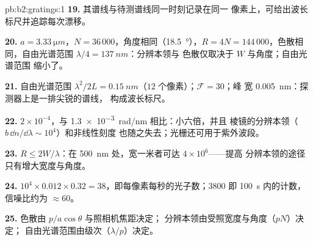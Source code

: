 \begin{solution}{pb:b2:gratings:1}
\textbf{19.} 其谱线与待测谱线同一时刻记录在同一
像素上，可给出波长标尺并追踪每次漂移。

\textbf{20.} $a = \qty{3.33}{\micro m}$，$N = 36\,000$，角度相同（\qty{18.5}{\degree}），$R = 4N
= 144\,000$，色散相同，自由光谱范围 $\lambda/4 = \qty{137}{nm}$：分辨本领与
色散仅取决于 $W$ 与角度；自由光谱范围
缩小了。

\textbf{21.} 自由光谱范围 $\lambda^2/2L = \qty{0.15}{nm}$（$12$ 个像素）；$\mathcal F = 30$；峰
宽 \qty{0.005}{nm}：探测器上是一排尖锐的谱线，
构成波长标尺。

\textbf{22.} $2 \times 10^{-4}$，与 \qty{1.3e-3}{rad/nm} 相比：小六倍，并且
棱镜的分辨本领（$b\,\dd n/\dd\lambda \sim 10^4$）和非线性刻度
也随之失去；光栅还可用于紫外波段。

\textbf{23.} $R \le 2W/\lambda$：在 \qty{500}{nm} 处，宽一米者可达 $4 \times 10^6$——提高
分辨本领的途径只有增大宽度与角度。

\textbf{24.} $10^4 \times 0.012 \times 0.32 = 38$，即每像素每秒的光子数；$3800$
即 \qty{100}{s} 内的计数，信噪比约为 $\approx 60$。

\textbf{25.} 色散由 $p/a\cos\theta$ 与照相机焦距决定；
分辨本领由受照宽度与角度（$pN$）决定；
自由光谱范围由级次（$\lambda/p$）决定。
\end{solution}
